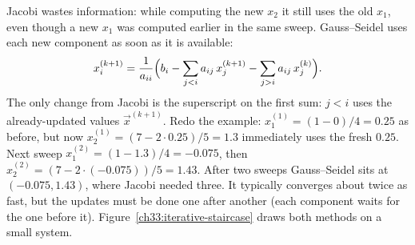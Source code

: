 Jacobi wastes information: while computing the new $x_2$ it still uses the old
$x_1$, even though a new $x_1$ was computed earlier in the same sweep. Gauss--Seidel
uses each new component as soon as it is available:
\[
  x_i^{(k+1)} = \frac{1}{a_{ii}}\Bigl(b_i - \sum_{j<i} a_{ij}\,x_j^{(k+1)}
     - \sum_{j>i} a_{ij}\,x_j^{(k)}\Bigr).
\]
The only change from Jacobi is the superscript on the first sum: $j<i$ uses the
already-updated values $\vec{x}^{(k+1)}$. Redo the example: $x_1^{(1)}=(1-0)/4=0.25$ as
before, but now $x_2^{(1)}=(7-2\cdot 0.25)/5 = 1.3$ immediately uses the fresh $0.25$.
Next sweep $x_1^{(2)}=(1-1.3)/4=-0.075$, then $x_2^{(2)}=(7-2\cdot(-0.075))/5=1.43$.
After two sweeps Gauss--Seidel sits at $(-0.075,1.43)$, where Jacobi needed three. It
typically converges about twice as fast, but the updates must be done one after
another (each component waits for the one before it).
Figure~\ref{ch33:iterative-staircase} draws both methods on a small system.

